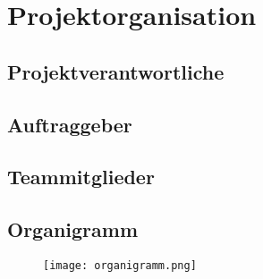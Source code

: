 \section{Projektorganisation}

\subsection{Projektverantwortliche}

\subsection{Auftraggeber}

\subsection{Teammitglieder}

\subsection{Organigramm}
\begin{figure}[H]
	\centering
	\texttt{[image: organigramm.png]}
	\label{fig:Organigramm}
\end{figure}
